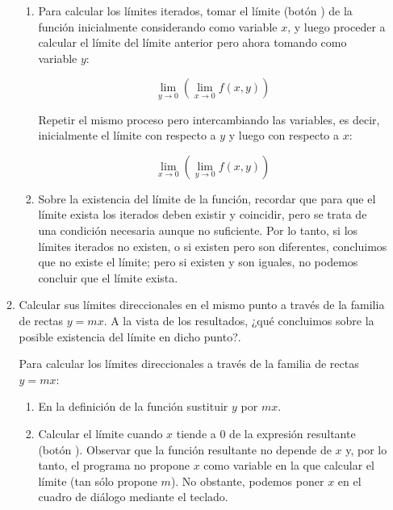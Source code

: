 \begin{enumerate}[leftmargin=*]
\begin{enumerate}
\begin{indication}
{




\begin{enumerate}

\item Para calcular los límites iterados, tomar el límite (botón
) de la función inicialmente considerando
como variable $x$, y luego proceder a calcular el límite del límite
anterior pero ahora tomando como variable $y$:

\[
\mathop {\lim }\limits_{y \to 0 } \left( {\mathop {\lim
}\limits_{x \to 0 } f(x,y)} \right)
\]

Repetir el mismo proceso pero intercambiando las variables, es
decir, inicialmente el límite con respecto a $y$ y luego con
respecto a $x$:

\[ \mathop {\lim }\limits_{x \to 0 } \left( {\mathop {\lim
}\limits_{y \to 0 } f(x,y)} \right)
\]

\item Sobre la existencia del límite de la función, recordar que
para que el límite exista los iterados deben existir y coincidir,
pero se trata de una condición necesaria aunque no suficiente. Por
lo tanto, si los límites iterados no existen, o si existen pero
son diferentes, concluimos que no existe el límite; pero si
existen y son iguales, no podemos concluir que el límite exista.

\end{enumerate}

}
\end{indication}


  \item Calcular sus límites direccionales en el mismo punto a través de la familia
  de rectas $y=mx$. A la vista de los resultados, ¿qué concluimos
  sobre la posible existencia del límite en dicho punto?.

\begin{indication}
{Para calcular los límites direccionales a través de la familia de
rectas $y=mx$:

\begin{enumerate}

\item En la definición de la función sustituir $y$ por $mx$.

\item Calcular el límite cuando $x$ tiende a 0 de la expresión
resultante (botón ). Observar que la
función resultante no depende de $x$ y, por lo tanto, el programa no
propone $x$ como variable en la que calcular el límite (tan sólo
propone $m$). No obstante, podemos poner $x$ en el cuadro de diálogo
mediante el teclado.


\end{enumerate}}
\end{indication}
\end{enumerate}
\end{enumerate}
